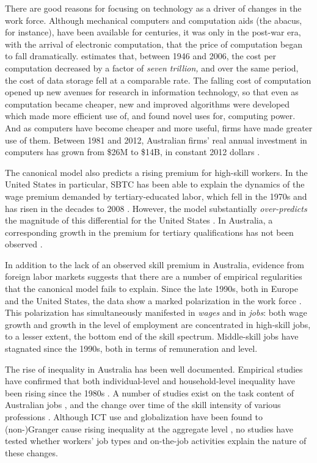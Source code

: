 There are good reasons for focusing on technology as a driver of changes in the work force. Although mechanical computers and computation aids (the abacus, for instance), have been available for centuries, it was only in the post-war era, with the arrival of electronic computation, that the price of computation began to fall dramatically. \citet{Nordhaus2007} estimates that, between 1946 and 2006, the cost per computation decreased by a factor of {\em seven trillion,} and over the same period, the cost of data storage fell at a comparable rate. The falling cost of computation opened up new avenues for research in information technology, so that even as computation became cheaper, new and improved algorithms were developed which made more efficient use of, and found novel uses for, computing power. And as computers have become cheaper and more useful, firms have made greater use of them. Between 1981 and 2012, Australian firms' real annual investment in computers has grown from \$26M to \$14B, in constant 2012 dollars \citet{ABS5206}.

The canonical model also predicts a rising premium for high-skill workers. In the United States in particular, SBTC has been able to explain the dynamics of the wage premium demanded by tertiary-educated labor, which fell in the 1970s and has risen in the decades to 2008 \citep{Acemoglu2011}. However, the model substantially \emph{over-predicts} the magnitude of this differential for the United States \citep{Autor2008}. In Australia, a corresponding growth in the premium for tertiary qualifications has not been observed \citep{Coelli2009}.

In addition to the lack of an observed skill premium in Australia, evidence from foreign labor markets suggests that there are a number of empirical regularities that the canonical model fails to explain. Since the late 1990s, both in Europe and the United States, the data show a marked polarization in the work force \citep{Goos2007, Autor2006}. This polarization has simultaneously manifested in \emph{wages} and in \emph{jobs}: both wage growth and growth in the level of employment are concentrated in high-skill jobs, to a lesser extent, the bottom end of the skill spectrum. Middle-skill jobs have stagnated since the 1990s, both in terms of remuneration and level.

The rise of inequality in Australia has been well documented. Empirical studies have confirmed that both individual-level and household-level inequality have been rising since the 1980s \citep{Borland1999,Leigh2005,Leigh2013,Gaston2009}. A number of studies exist on the task content of Australian jobs \citep{Esposto2012a}, and the change over time of the skill intensity of various professions \citep{Esposto2012, Esposto2012a}. Although ICT use and globalization have been found to (non-)Granger cause rising inequality at the aggregate level \citep{Gaston2009}, no studies have tested whether workers' job types and on-the-job activities explain the nature of these changes.

